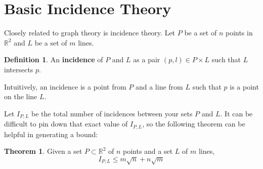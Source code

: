 \documentclass{scrippsthesisclass}
\theoremstyle{definition}
\newtheorem{defn}{Definition}[section]
\newtheorem{theorem}{Theorem}[section]
\begin{document}
\newpage
\section{Basic Incidence Theory}
Closely related to graph theory is incidence theory. 
Let $P$ be a set of $n$ points in $\mathbb{R}^2$ and $L$ be a set of $m$ lines.  
\begin{defn}
    An \textbf{incidence} of $P$ and $L$ as a pair $(p,l) \in P \times L$ such that $L$ intersects $p$. 
\end{defn}
Intuitively, an incidence is a point from $P$ and a line from $L$ such that $p$ is a point on the line $L$.

Let $I_{P,L}$ be the total number of incidences between your sets $P$ and $L$. 
It can be difficult to pin down that exact value of $I_{P,L}$, so the following theorem can be helpful in generating a bound:
\begin{theorem}
    Given a set $P \subset \mathbb{R}^2$ of $n$ points and a set $L$ of $m$ lines, \[
    I_{P, L} \leq m \sqrt{n} + n \sqrt{m}
    \]
\end{theorem}
\end{document}
